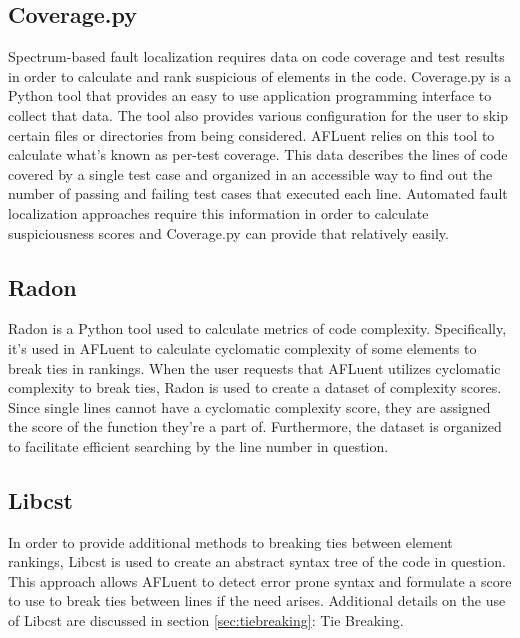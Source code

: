 \subsection{Coverage.py}
\label{subsec:coverage}

Spectrum-based fault localization requires data on code coverage and test
results in order to calculate and rank suspicious of elements in the code.
Coverage.py\cite{coverage_py_website} is a Python tool that provides an easy to use application
programming interface to collect that data. The tool also provides various
configuration for the user to skip certain files or directories from being
considered. AFLuent relies on this tool to calculate what's known as per-test
coverage. This data describes the lines of code covered by a single test case
and organized in an accessible way to find out the number of passing and failing
test cases that executed each line. Automated fault localization approaches
require this information in order to calculate suspiciousness scores and
Coverage.py can provide that relatively easily.

\subsection{Radon}
\label{subsec:radon}

Radon is a Python tool used to calculate metrics of code complexity.
Specifically, it's used in AFLuent to calculate cyclomatic complexity of some
elements to break ties in rankings. When the user requests that AFLuent
utilizes cyclomatic complexity to break ties, Radon is
used to create a dataset of complexity scores. Since single lines cannot have a
cyclomatic complexity score, they are assigned the score of the function they're
a part of. Furthermore, the dataset is organized to facilitate efficient
searching by the line number in question.

\subsection{Libcst}
\label{subsec:libcst}

In order to provide additional methods to breaking ties between element
rankings, Libcst is used to create an abstract syntax tree of the code in
question. This approach allows AFLuent to detect error prone syntax and
formulate a score to use to break ties between lines if the need arises.
Additional details on the use of Libcst are discussed in section
\ref{sec:tiebreaking}: Tie Breaking.

